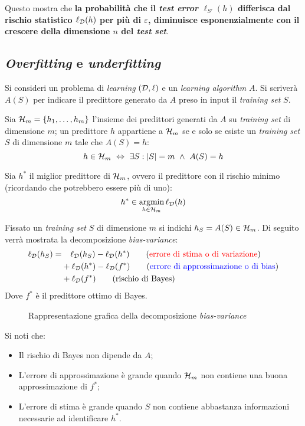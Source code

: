 Questo mostra che \textbf{la probabilità che il \textit{test error} 
$\ell_{S'}(h)$ differisca dal rischio statistico $\ell_{\mathcal{D}}(h)$ per più di 
$\varepsilon$, diminuisce esponenzialmente con il crescere della dimensione $n$ 
del \textit{test set}}.

\subsection{\textit{Overfitting} e \textit{underfitting}}
Si consideri un problema di \textit{learning} $(\mathcal{D},\ell)$ e un \textit{learning
algorithm} $A$. Si scriverà $A(S)$ per indicare il predittore generato da $A$
preso in input il \textit{training set} $S$.

Sia $\mathcal{H}_m = \{h_1,\dots,h_m\}$ l'insieme dei predittori generati da $A$ su 
\textit{training set} di dimensione $m$; un predittore $h$ appartiene a $\mathcal{H}_m$ se
e solo se esiste un \textit{training set} $S$ di dimensione $m$ tale che $A(S)=h$:
$$ h\in\mathcal{H}_m \ \Leftrightarrow \ \exists S : |S|=m \ \wedge \ A(S)=h $$

Sia $h^*$ il miglior predittore di $\mathcal{H}_m$, ovvero il predittore con il rischio minimo
(ricordando che potrebbero essere più di uno):
$$ h^* \in \operatorname*{argmin}_{h\in\mathcal{H}_m} \ell_{\mathcal{D}}(h) $$

Fissato un \textit{training set} $S$ di dimensione $m$ si indichi
$ h_S = A(S) \in \mathcal{H}_m $. Di seguito verrà mostrata la decomposizione
\textit{bias-variance}:
\begin{align}
    \ell_\D(h_S) =& \phantom{+.} \ell_\D(h_S) - \ell_\D(h^*)
    \tag{{\color{red}errore di stima o di variazione}}\\ 
        & +\ell_\D(h^*) - \ell_\D(f^*)
            \tag{{\color{blue}errore di approssimazione o di bias}}\\
        & +\ell_\D(f^*) \tag{rischio di Bayes}
\end{align}
Dove $f^*$ è il predittore ottimo di Bayes.
\begin{figure}[h]
    \centering
    
    \caption{Rappresentazione grafica della decomposizione \textit{bias-variance}}
\end{figure}

Si noti che:
\begin{itemize}
    \item Il rischio di Bayes non dipende da $A$;
    \item L'errore di approssimazione è grande quando $\mathcal{H}_m$ non contiene una buona
        approssimazione di $f^*$;
    \item L'errore di stima è grande quando $S$ non contiene abbastanza informazioni
        necessarie ad identificare $h^*$.
\end{itemize}